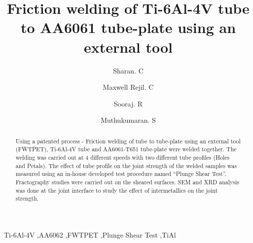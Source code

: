 \documentclass[preprint]{elsarticle}
\begin{document}
\newcommand{\degree}[1]{\ensuremath{^{\circ}}}  %



\begin{frontmatter}

\title{Friction welding of Ti-6Al-4V tube to AA6061 tube-plate using an external tool}

\author[META]{Sharan. C}
\author[META]{Maxwell Rejil. C}
\author[META]{Sooraj. R}
\author[META]{Muthukumaran. S}


\address[META]{Department of Metallurgical and Materials Engineering, National Institute of Technology, Tiruchirappalli-620015, India}
         
\begin{abstract}
Using a patented process - Friction welding of tube to tube-plate using an external tool (FWTPET), Ti-6Al-4V tube and AA6061-T651 tube-plate were welded together. The welding was carried out at 4 different speeds with two different tube profiles (Holes and Petals). The effect of tube profile on the joint strength of the welded samples was measured using an in-house developed test procedure named ``Plunge Shear Test''. Fractography studies were carried out on the  sheared surfaces. SEM and XRD analysis was done at the joint interface to study the effect of intermetallics on the joint strength.
\end{abstract}

\begin{keyword}
Ti-6Al-4V \sep AA6062 \sep FWTPET \sep Plunge Shear Test \sep TiAl
\end{keyword}

\end{frontmatter}

\end{document}
